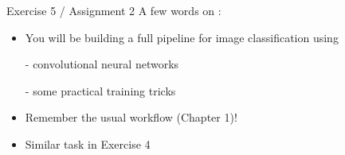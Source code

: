 \begin{frame}{Exercise 5 / Assignment 2}
	A few words on :
	\begin{itemize}
		\item You will be building a full pipeline for image classification using
        \item[-] convolutional neural networks
        \item[-] some practical training tricks
		\item Remember the usual workflow (Chapter 1)!
        \item Similar task in Exercise 4
	\end{itemize}
\end{frame}